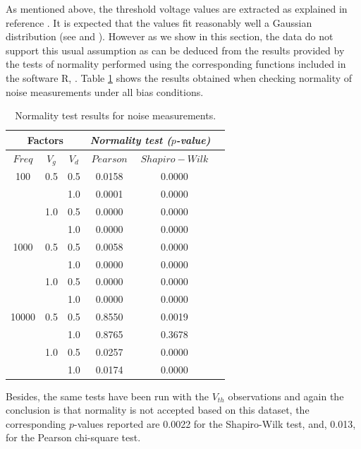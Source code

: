 \documentclass[sn-mathphys]{sn-jnl}%
\theoremstyle{thmstyleone}%
\theoremstyle{thmstyletwo}%
\theoremstyle{thmstylethree}%
\begin{document}
As mentioned above, the threshold voltage values are extracted as explained in reference \cite{Duty2016}. It is expected that the values fit reasonably well a Gaussian distribution (see \cite{Duty2016} and \cite{Schroder2006}). However as we show in this section, the data do not support this usual assumption as can be deduced from the results provided by the tests of normality performed using the corresponding functions included in the software R, \cite{R2021}. Table \ref{tab:normality} shows the results obtained when checking normality of noise measurements under all bias conditions.


\begin{table}[!t]
	\centering
	\begin{tabular}{|c|c|c|c|c|c|}
		\hline
		\multicolumn{3}{|c|}{Factors}&\multicolumn{2}{c|}{{\it Normality test ($p$-value)}} \\ \hline
		$Freq$ & $V_g$ & $V_d$ & $Pearson$ & $Shapiro-Wilk$ \\ 
		\hline
		100   & 0.5 & 0.5 & 0.0158 & 0.0000 \\ 
		&     & 1.0 & 0.0001 & 0.0000 \\ 
		& 1.0 & 0.5 & 0.0000 & 0.0000 \\ 
		&     & 1.0 & 0.0000 & 0.0000 \\ 
		1000  & 0.5 & 0.5 & 0.0058 & 0.0000 \\ 
		&     & 1.0 & 0.0000 & 0.0000 \\ 
		& 1.0 & 0.5 & 0.0000 & 0.0000 \\ 
		&     & 1.0 & 0.0000 & 0.0000 \\ 
		10000 & 0.5 & 0.5 & 0.8550 & 0.0019 \\ 
		&     & 1.0 & 0.8765 & 0.3678 \\ 
		& 1.0 & 0.5 & 0.0257 & 0.0000\\ 
		&     & 1.0 & 0.0174 & 0.0000\\ 
		\hline
	\end{tabular}
	\caption{Normality test results for noise measurements.} 
	\label{tab:normality}
\end{table}

Besides, the same tests have been run with the $V_{th}$ observations and again the conclusion is that normality is not accepted based on this dataset, the corresponding $p$-values reported are  0.0022 for the Shapiro-Wilk test, and, 0.013, for the Pearson chi-square test.
\end{document}
